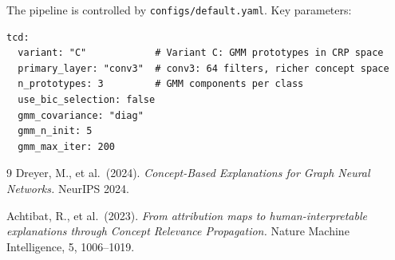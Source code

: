 \documentclass[11pt,a4paper]{article}
\begin{document}
The pipeline is controlled by \texttt{configs/default.yaml}.  Key parameters:

\begin{lstlisting}[basicstyle=\ttfamily\small, breaklines=true]
tcd:
  variant: "C"            # Variant C: GMM prototypes in CRP space
  primary_layer: "conv3"  # conv3: 64 filters, richer concept space
  n_prototypes: 3         # GMM components per class
  use_bic_selection: false
  gmm_covariance: "diag"
  gmm_n_init: 5
  gmm_max_iter: 200
\end{lstlisting}

\begin{thebibliography}{9}
  Dreyer, M., et al.\ (2024).
  \emph{Concept-Based Explanations for Graph Neural Networks.}
  NeurIPS 2024.

  Achtibat, R., et al.\ (2023).
  \emph{From attribution maps to human-interpretable explanations through
  Concept Relevance Propagation.}
  Nature Machine Intelligence, 5, 1006--1019.
\end{thebibliography}
\end{document}
